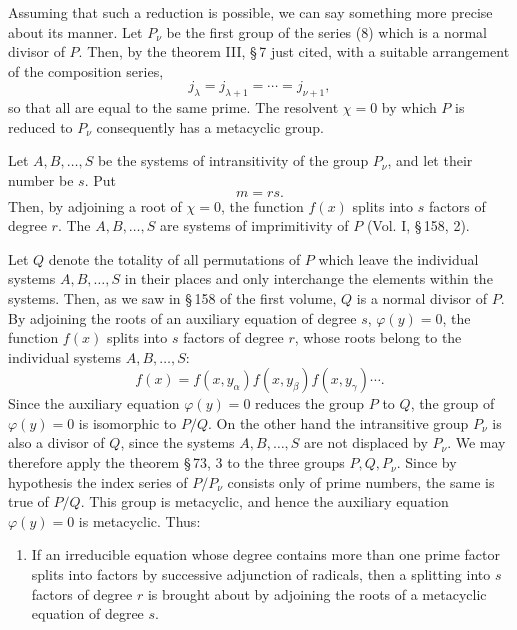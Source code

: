 \documentclass[11pt]{article}
\begin{document}
Assuming that such a reduction is possible, we can say something more precise about its manner. Let $P_\nu$ be the first group of the series (8) which is a normal divisor of $P$. Then, by the theorem III, \S\,7 just cited, with a suitable arrangement of the composition series,
\begin{equation}
 j_\lambda=j_{\lambda+1}=\cdots=j_{\nu+1},
 \tag{9}
\end{equation}
so that all are equal to the same prime. The resolvent $\chi=0$ by which $P$ is reduced to $P_\nu$ consequently has a metacyclic group.

Let $A,B,\ldots,S$ be the systems of intransitivity of the group $P_\nu$, and let their number be $s$. Put
\begin{equation}
 m=rs.
 \tag{10}
\end{equation}
Then, by adjoining a root of $\chi=0$, the function $f(x)$ splits into $s$ factors of degree $r$. The $A,B,\ldots,S$ are systems of imprimitivity of $P$ (Vol. I, \S\,158, 2).

Let $Q$ denote the totality of all permutations of $P$ which leave the individual systems $A,B,\ldots,S$ in their places and only interchange the elements within the systems. Then, as we saw in \S\,158 of the first volume, $Q$ is a normal divisor of $P$. By adjoining the roots of an auxiliary equation of degree $s$, $\varphi(y)=0$, the function $f(x)$ splits into $s$ factors of degree $r$, whose roots belong to the individual systems $A,B,\ldots,S$:
\[
 f(x)=f(x,y_\alpha)f(x,y_\beta)f(x,y_\gamma)\cdots .
\]
Since the auxiliary equation $\varphi(y)=0$ reduces the group $P$ to $Q$, the group of $\varphi(y)=0$ is isomorphic to $P/Q$. On the other hand the intransitive group $P_\nu$ is also a divisor of $Q$, since the systems $A,B,\ldots,S$ are not displaced by $P_\nu$. We may therefore apply the theorem \S\,73, 3 to the three groups $P,Q,P_\nu$. Since by hypothesis the index series of $P/P_\nu$ consists only of prime numbers, the same is true of $P/Q$. This group is metacyclic, and hence the auxiliary equation $\varphi(y)=0$ is metacyclic. Thus:

\begin{enumerate}[label=\arabic*.,leftmargin=2.6em,start=2]
\item If an irreducible equation whose degree contains more than one prime factor splits into factors by successive adjunction of radicals, then a splitting into $s$ factors of degree $r$ is brought about by adjoining the roots of a metacyclic equation of degree $s$.
\end{enumerate}
\end{document}
